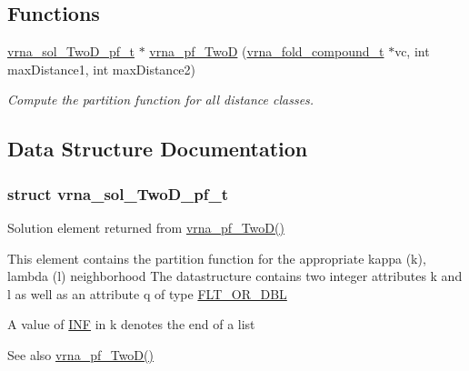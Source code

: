 \subsection*{Functions}
\begin{DoxyCompactItemize}
\item 
\mbox{\hyperlink{group__kl__neighborhood__pf_structvrna__sol__TwoD__pf__t}{vrna\+\_\+sol\+\_\+\+Two\+D\+\_\+pf\+\_\+t}} $\ast$ \mbox{\hyperlink{group__kl__neighborhood__pf_ga0bc3427689bd09da09b8b3094a27f836}{vrna\+\_\+pf\+\_\+\+TwoD}} (\mbox{\hyperlink{group__fold__compound_ga1b0cef17fd40466cef5968eaeeff6166}{vrna\+\_\+fold\+\_\+compound\+\_\+t}} $\ast$vc, int max\+Distance1, int max\+Distance2)
\begin{DoxyCompactList}\small\item\em Compute the partition function for all distance classes. \end{DoxyCompactList}\end{DoxyCompactItemize}


\subsection{Data Structure Documentation}
\label{structvrna__sol__TwoD__pf__t}
\subsubsection{struct vrna\+\_\+sol\+\_\+\+Two\+D\+\_\+pf\+\_\+t}
Solution element returned from \mbox{\hyperlink{group__kl__neighborhood__pf_ga0bc3427689bd09da09b8b3094a27f836}{vrna\+\_\+pf\+\_\+\+Two\+D()}} 

This element contains the partition function for the appropriate kappa (k), lambda (l) neighborhood The datastructure contains two integer attributes \textquotesingle{}k\textquotesingle{} and \textquotesingle{}l\textquotesingle{} as well as an attribute \textquotesingle{}q\textquotesingle{} of type \mbox{\hyperlink{group__data__structures_ga31125aeace516926bf7f251f759b6126}{F\+L\+T\+\_\+\+O\+R\+\_\+\+D\+BL}}

A value of \mbox{\hyperlink{constants_8h_a12c2040f25d8e3a7b9e1c2024c618cb6}{I\+NF}} in k denotes the end of a list

\begin{DoxySeeAlso}{See also}
\mbox{\hyperlink{group__kl__neighborhood__pf_ga0bc3427689bd09da09b8b3094a27f836}{vrna\+\_\+pf\+\_\+\+Two\+D()}} 
\end{DoxySeeAlso}
